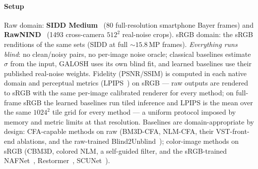 \documentclass[journal]{IEEEtran}
\begin{document}
\paragraph{Setup} Raw domain: \textbf{SIDD Medium}~\cite{sidd} (80
full-resolution smartphone Bayer frames) and \textbf{RawNIND}~\cite{rawnind}
(1493 cross-camera $512^2$ real-noise crops). sRGB domain: the sRGB renditions
of the same sets (SIDD at full ${\sim}15.8$\,MP frames). \emph{Everything
runs blind}: no clean/noisy pairs, no per-image noise oracle; classical
baselines estimate $\sigma$ from the input, GALOSH uses its own blind fit, and
learned baselines use their published real-noise weights. Fidelity
(PSNR/SSIM) is computed in each native domain and perceptual metrics
(LPIPS~\cite{lpips}) on sRGB --- raw outputs are rendered to sRGB with the
same per-image calibrated renderer for every method; on full-frame sRGB the learned baselines run
tiled inference and LPIPS is the mean over the same $1024^2$ tile grid for
every method --- a uniform protocol imposed by memory and metric limits at
that resolution. Baselines are domain-appropriate by design: CFA-capable
methods on raw (BM3D-CFA, NLM-CFA, their VST-front-end ablations, and the
raw-trained Blind2Unblind~\cite{b2u}); color-image methods on sRGB (CBM3D,
colored NLM, a self-guided filter, and the sRGB-trained NAFNet~\cite{nafnet},
Restormer~\cite{restormer}, SCUNet~\cite{scunet}).
\end{document}
